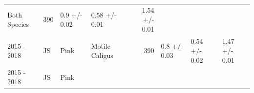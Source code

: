 \documentclass[fleqn,10pt]{wlpeerj} %
\begin{document}
\begin{longtable}[]{@{}llllrlll@{}}
\begin{minipage}[t]{0.11\columnwidth}
Both Species\strut
\end{minipage} & \begin{minipage}[t]{0.04\columnwidth}\raggedleft\strut
390\strut
\end{minipage} & \begin{minipage}[t]{0.14\columnwidth}\raggedright\strut
0.9 +/- 0.02\strut
\end{minipage} & \begin{minipage}[t]{0.14\columnwidth}\raggedright\strut
0.58 +/- 0.01\strut
\end{minipage} & \begin{minipage}[t]{0.14\columnwidth}\raggedright\strut
1.54 +/- 0.01\strut
\end{minipage}\tabularnewline
\begin{minipage}[t]{0.09\columnwidth}\raggedright\strut
2015 - 2018\strut
\end{minipage} & \begin{minipage}[t]{0.06\columnwidth}\raggedright\strut
JS\strut
\end{minipage} & \begin{minipage}[t]{0.06\columnwidth}\raggedright\strut
Pink\strut
\end{minipage} & \begin{minipage}[t]{0.11\columnwidth}\raggedright\strut
Motile Caligus\strut
\end{minipage} & \begin{minipage}[t]{0.04\columnwidth}\raggedleft\strut
390\strut
\end{minipage} & \begin{minipage}[t]{0.14\columnwidth}\raggedright\strut
0.8 +/- 0.03\strut
\end{minipage} & \begin{minipage}[t]{0.14\columnwidth}\raggedright\strut
0.54 +/- 0.02\strut
\end{minipage} & \begin{minipage}[t]{0.14\columnwidth}\raggedright\strut
1.47 +/- 0.01\strut
\end{minipage}\tabularnewline
\begin{minipage}[t]{0.09\columnwidth}\raggedright\strut
2015 - 2018\strut
\end{minipage} & \begin{minipage}[t]{0.06\columnwidth}\raggedright\strut
JS\strut
\end{minipage} & \begin{minipage}[t]{0.06\columnwidth}\raggedright\strut
Pink\strut
\end{minipage} & \begin{minipage}[t]{0.11\columnwidth}\raggedright\strut

\end{minipage}
\end{longtable}
\end{document}
